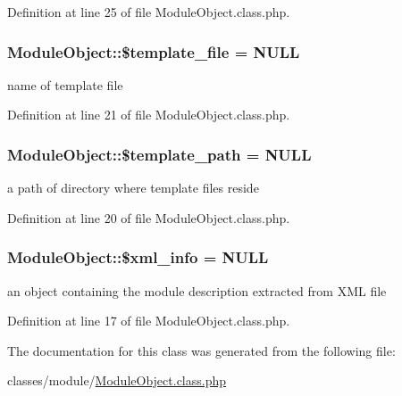 Definition at line 25 of file Module\+Object.\+class.\+php.

\subsubsection[{\texorpdfstring{\$template\+\_\+file}{$template_file}}]{\setlength{\rightskip}{0pt plus 5cm}Module\+Object\+::\$template\+\_\+file = N\+U\+LL}\hypertarget{classModuleObject_a6eddf08e627527affc7e835a6d302733}{}\label{classModuleObject_a6eddf08e627527affc7e835a6d302733}


name of template file 



Definition at line 21 of file Module\+Object.\+class.\+php.

\subsubsection[{\texorpdfstring{\$template\+\_\+path}{$template_path}}]{\setlength{\rightskip}{0pt plus 5cm}Module\+Object\+::\$template\+\_\+path = N\+U\+LL}\hypertarget{classModuleObject_a8a632bae853adef8e2ab9596a3a86661}{}\label{classModuleObject_a8a632bae853adef8e2ab9596a3a86661}


a path of directory where template files reside 



Definition at line 20 of file Module\+Object.\+class.\+php.

\subsubsection[{\texorpdfstring{\$xml\+\_\+info}{$xml_info}}]{\setlength{\rightskip}{0pt plus 5cm}Module\+Object\+::\$xml\+\_\+info = N\+U\+LL}\hypertarget{classModuleObject_aa0003698bcfe16bb25031435df251715}{}\label{classModuleObject_aa0003698bcfe16bb25031435df251715}


an object containing the module description extracted from X\+ML file 



Definition at line 17 of file Module\+Object.\+class.\+php.



The documentation for this class was generated from the following file\+:\begin{DoxyCompactItemize}
\item 
classes/module/\hyperlink{ModuleObject_8class_8php}{Module\+Object.\+class.\+php}\end{DoxyCompactItemize}
